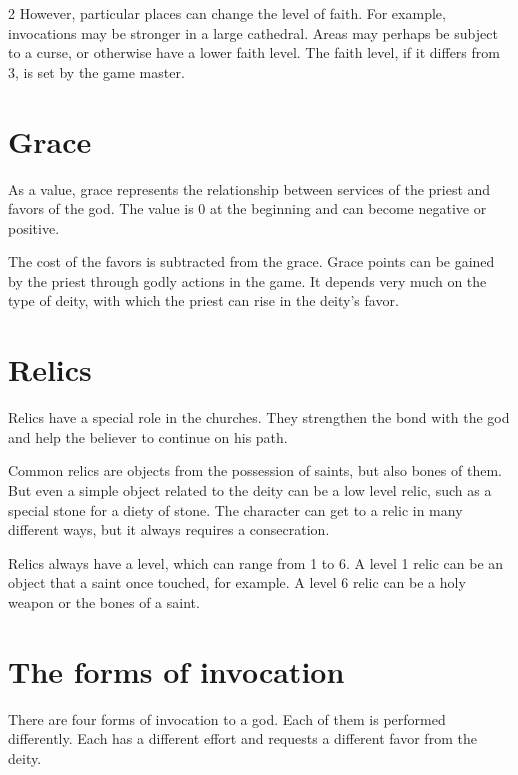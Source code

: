 \begin{multicols}{2}
{However, particular places can change the level of faith. For example, invocations may be stronger in a large cathedral. Areas may perhaps be subject to a curse, or otherwise have a lower faith level. The faith level, if it differs from 3, is set by the game master.
}

\section{Grace}

As a value, grace represents the relationship between services of the priest and favors of the god. The value is 0 at the beginning and can become negative or positive.

The cost of the favors is subtracted from the grace. Grace points can be gained by the priest through godly actions in the game. It depends very much on the type of deity, with which the priest can rise in the deity's favor.

\section{Relics}

Relics have a special role in the churches. They strengthen the bond with the god and help the believer to continue on his path.

Common relics are objects from the possession of saints, but also bones of them. But even a simple object related to the deity can be a low level relic, such as a special stone for a diety of stone. The character can get to a relic in many different ways, but it always requires a consecration.

Relics always have a level, which can range from 1 to 6. A level 1 relic can be an object that a saint once touched, for example. A level 6 relic can be a holy weapon or the bones of a saint.

\section{The forms of invocation}

There are four forms of invocation to a god. Each of them is performed differently. Each has a different effort and requests a different favor from the deity.


\end{multicols}
